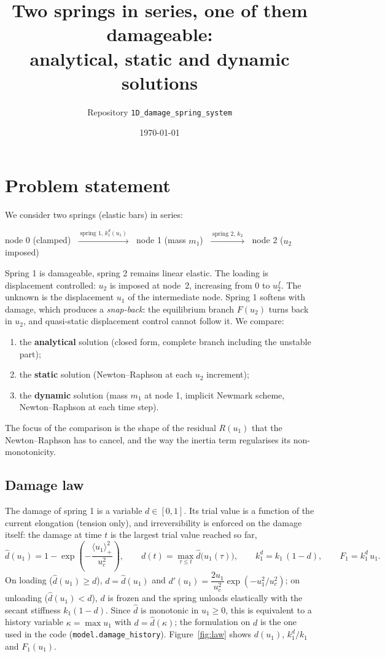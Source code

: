 \documentclass[11pt,a4paper]{article}
\title{Two springs in series, one of them damageable:\\
analytical, static and dynamic solutions}
\author{Repository \texttt{1D\_damage\_spring\_system}}
\date{\today}
\newcommand{\kd}{k_1^{d}}
\begin{document}
\maketitle

\section{Problem statement}

We consider two springs (elastic bars) in series:
\begin{center}
node 0 (clamped) $\;\xrightarrow{\;\text{spring 1, } \kd(u_1)\;}\;$ node 1 (mass $m_1$)
$\;\xrightarrow{\;\text{spring 2, } k_2\;}\;$ node 2 ($u_2$ imposed)
\end{center}
Spring 1 is damageable, spring 2 remains linear elastic. The loading is displacement
controlled: $u_2$ is imposed at node~2, increasing from $0$ to $u_2^f$. The unknown is the
displacement $u_1$ of the intermediate node. Spring 1 softens with damage, which produces a
\emph{snap-back}: the equilibrium branch $F(u_2)$ turns back in $u_2$, and quasi-static
displacement control cannot follow it. We compare:
\begin{enumerate}
  \item the \textbf{analytical} solution (closed form, complete branch including the unstable part);
  \item the \textbf{static} solution (Newton--Raphson at each $u_2$ increment);
  \item the \textbf{dynamic} solution (mass $m_1$ at node 1, implicit Newmark scheme,
        Newton--Raphson at each time step).
\end{enumerate}
The focus of the comparison is the shape of the residual $R(u_1)$ that the
Newton--Raphson has to cancel, and the way the inertia term regularises its non-monotonicity.

\subsection{Damage law}
The damage of spring 1 is a variable $d\in[0,1]$. Its trial value is a function of the
current elongation (tension only), and irreversibility is enforced on the damage itself: the
damage at time $t$ is the largest trial value reached so far,
\begin{equation}
  \hat d(u_1) = 1 - \exp\!\left(-\frac{\langle u_1\rangle_+^2}{u_c^2}\right),\qquad
  d(t) = \max_{\tau\le t}\hat d\bigl(u_1(\tau)\bigr),\qquad
  \kd = k_1\,(1-d),\qquad F_1 = \kd\,u_1 .
\end{equation}
On loading ($\hat d(u_1)\ge d$), $d = \hat d(u_1)$ and $d'(u_1) = \dfrac{2u_1}{u_c^2}\exp(-u_1^2/u_c^2)$;
on unloading ($\hat d(u_1) < d$), $d$ is frozen and the spring unloads elastically with the secant
stiffness $k_1(1-d)$. Since $\hat d$ is monotonic in $u_1\ge0$, this is equivalent to a history
variable $\kappa = \max u_1$ with $d = \hat d(\kappa)$; the formulation on $d$ is the one used in
the code (\texttt{model.damage\_history}). Figure~\ref{fig:law} shows $d(u_1)$, $\kd/k_1$ and
$F_1(u_1)$.
\end{document}
